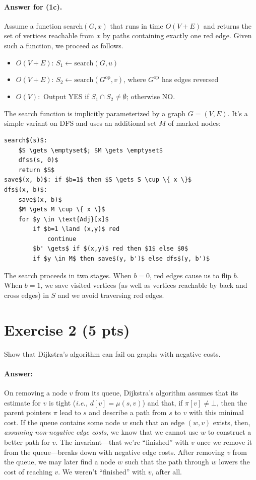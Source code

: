 \documentclass[a4paper]{article}
\newcommand{\ie}{\emph{i.e.,} }
\begin{document}
\paragraph{Answer for (1c).}
Assume a function search$(G, x)$ that runs in time $O(V+E)$ and returns the set of vertices reachable from $x$ by paths containing exactly one red edge.
Given such a function, we proceed as follows.
\begin{itemize}
	\item
	$O(V+E)$: $S_1 \gets \text{search}(G, u)$

	\item
	$O(V+E)$: $S_2 \gets \text{search}(G^\text{op}, v)$, where $G^\text{op}$ has edges reversed

	\item
	$O(V):$ Output YES if $S_1 \cap S_2 \not= \emptyset$; otherwise NO.
\end{itemize}
The search function is implicitly parameterized by a graph $G=(V,E)$.
It's a simple variant on DFS and uses an additional set $M$ of marked nodes:
\begin{lstlisting}[numbers=none,xleftmargin=1cm]
search$(s)$:
	$S \gets \emptyset$; $M \gets \emptyset$
	dfs$(s, 0)$
	return $S$
save$(x, b)$: if $b=1$ then $S \gets S \cup \{ x \}$
dfs$(x, b)$:
	save$(x, b)$
	$M \gets M \cup \{ x \}$
	for $y \in \text{Adj}[x]$
		if $b=1 \land (x,y)$ red
			continue
		$b' \gets$ if $(x,y)$ red then $1$ else $0$
		if $y \in M$ then save$(y, b')$ else dfs$(y, b')$\end{lstlisting}
The search proceeds in two stages.
When $b=0$, red edges cause us to flip $b$.
When $b=1$, we save visited vertices (as well as vertices reachable by back and cross edges) in $S$ and we avoid traversing red edges.

\section*{Exercise 2 (5 pts)}

Show that Dijkstra's algorithm can fail on graphs with negative costs.

\paragraph{Answer:}
On removing a node $v$ from its queue, Dijkstra's algorithm assumes that its estimate for $v$ is tight (\ie $d[v] = \mu(s, v)$) and that, if $\pi[v] \not= \bot$, then the parent pointers $\pi$ lead to $s$ and describe a path from $s$ to $v$ with this minimal cost.
If the queue contains some node $w$ such that an edge $(w, v)$ exists, then, \emph{assuming non-negative edge costs,} we know that we cannot use $w$ to construct a better path for $v$.
The invariant---that we're ``finished'' with $v$ once we remove it from the queue---breaks down with negative edge costs.
After removing $v$ from the queue, we may later find a node $w$ such that the path through $w$ lowers the cost of reaching $v$.
We weren't ``finished'' with $v$, after all.
\end{document}

